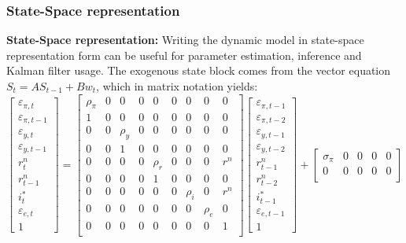 \documentclass{beamer}
\begin{document}
\begin{frame} 
\frametitle{State-Space representation} 
\textbf{State-Space representation:} Writing the dynamic model in state-space representation form can be useful for parameter estimation, inference and Kalman filter usage.
The exogenous state block comes from the vector equation $S_t = A S_{t-1} + B
w_t$, which in matrix notation yields:
{\tiny
\begin{equation}
\begin{bmatrix}
\varepsilon_{\pi,t} \\
\varepsilon_{\pi,t-1} \\
\varepsilon_{y,t} \\
\varepsilon_{y,t-1} \\
r_t^n \\
r_{t-1}^n \\
i_t^* \\
\varepsilon_{e,t} \\
1
\end{bmatrix}
=
\begin{bmatrix}
\rho_\pi & 0 & 0 & 0 & 0 & 0 & 0 & 0 & 0 \\
1 & 0 & 0 & 0 & 0 & 0 & 0 & 0 & 0 \\
0 & 0 & \rho_y & 0 & 0 & 0 & 0 & 0 & 0 \\
0 & 0 & 1 & 0 & 0 & 0 & 0 & 0 & 0 \\
0 & 0 & 0 & 0 & \rho_r & 0 & 0 & 0 & r^n \\
0 & 0 & 0 & 0 & 1 & 0 & 0 & 0 & 0 \\
0 & 0 & 0 & 0 & 0 & 0 & \rho_i & 0 & r^n \\
0 & 0 & 0 & 0 & 0 & 0 & 0 & \rho_e & 0 \\
0 & 0 & 0 & 0 & 0 & 0 & 0 & 0 & 1 \\
\end{bmatrix}
\begin{bmatrix}
\varepsilon_{\pi,t-1} \\
\varepsilon_{\pi,t-2} \\
\varepsilon_{y,t-1} \\
\varepsilon_{y,t-2} \\
r_{t-1}^n \\
r_{t-2}^n \\
i_{t-1}^* \\
\varepsilon_{e,t-1} \\
1
\end{bmatrix}
+
\begin{bmatrix}
\sigma_\pi & 0 & 0 & 0 & 0 \\
0 & 0 & 0 & 0 & 0 \\

\end{bmatrix}
\end{equation}}
\end{frame}
\end{document}
